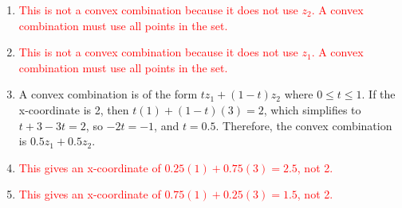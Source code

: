 \documentclass{article}%
\newcommand{\incorrect}[1]{\textcolor{red}{#1}}
\begin{document}
\begin{enumerate}
\begin{enumerate}
\item \incorrect{This is not a convex combination because it does not use $z_2$.  A convex combination must use all points in the set.}%
\item \incorrect{This is not a convex combination because it does not use $z_1$. A convex combination must use all points in the set.}%
\item A convex combination is of the form $tz_1 + (1-t)z_2$ where $0 \le t \le 1$.  If the x-coordinate is 2, then $t(1) + (1-t)(3) = 2$, which simplifies to $t + 3 - 3t = 2$, so $-2t = -1$, and $t = 0.5$. Therefore, the convex combination is $0.5z_1 + 0.5z_2$.%
\item \incorrect{This gives an x-coordinate of $0.25(1) + 0.75(3) = 2.5$, not 2.}%
\item \incorrect{This gives an x-coordinate of $0.75(1) + 0.25(3) = 1.5$, not 2.}%
\end{enumerate}%
\vspace{1em}%
\end{enumerate}

%
\end{document}
